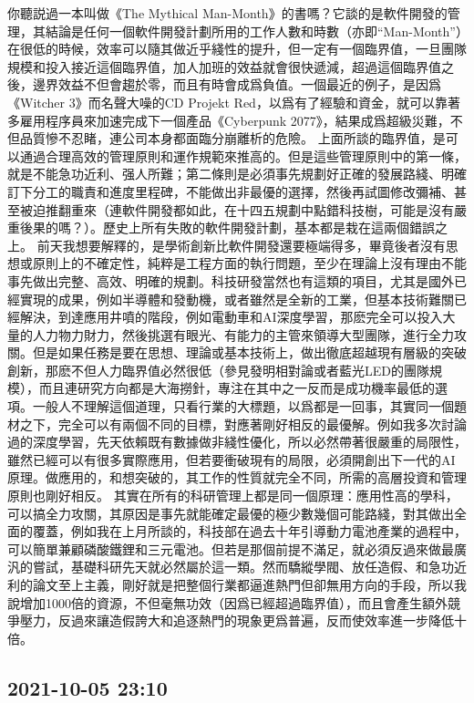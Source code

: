 \documentclass[twocolumn]{ctexart}
\begin{document}
你聽説過一本叫做《The Mythical Man-Month》的書嗎？它談的是軟件開發的管理，其結論是任何一個軟件開發計劃所用的工作人數和時數（亦即“Man-Month”）在很低的時候，效率可以隨其做近乎綫性的提升，但一定有一個臨界值，一旦團隊規模和投入接近這個臨界值，加人加班的效益就會很快遞減，超過這個臨界值之後，邊界效益不但會趨於零，而且有時會成爲負值。一個最近的例子，是因爲《Witcher 3》而名聲大噪的CD Projekt Red，以爲有了經驗和資金，就可以靠著多雇用程序員來加速完成下一個產品《Cyberpunk 2077》，結果成爲超級災難，不但品質慘不忍睹，連公司本身都面臨分崩離析的危險。
上面所談的臨界值，是可以通過合理高效的管理原則和運作規範來推高的。但是這些管理原則中的第一條，就是不能急功近利、强人所難；第二條則是必須事先規劃好正確的發展路綫、明確訂下分工的職責和進度里程碑，不能做出非最優的選擇，然後再試圖修改彌補、甚至被迫推翻重來（連軟件開發都如此，在十四五規劃中點錯科技樹，可能是沒有嚴重後果的嗎？）。歷史上所有失敗的軟件開發計劃，基本都是栽在這兩個錯誤之上。
前天我想要解釋的，是學術創新比軟件開發還要極端得多，畢竟後者沒有思想或原則上的不確定性，純粹是工程方面的執行問題，至少在理論上沒有理由不能事先做出完整、高效、明確的規劃。科技研發當然也有這類的項目，尤其是國外已經實現的成果，例如半導體和發動機，或者雖然是全新的工業，但基本技術難關已經解決，到達應用井噴的階段，例如電動車和AI深度學習，那麽完全可以投入大量的人力物力財力，然後挑選有眼光、有能力的主管來領導大型團隊，進行全力攻關。但是如果任務是要在思想、理論或基本技術上，做出徹底超越現有層級的突破創新，那麽不但人力臨界值必然很低（參見發明相對論或者藍光LED的團隊規模），而且連研究方向都是大海撈針，專注在其中之一反而是成功機率最低的選項。一般人不理解這個道理，只看行業的大標題，以爲都是一回事，其實同一個題材之下，完全可以有兩個不同的目標，對應著剛好相反的最優解。例如我多次討論過的深度學習，先天依賴既有數據做非綫性優化，所以必然帶著很嚴重的局限性，雖然已經可以有很多實際應用，但若要衝破現有的局限，必須開創出下一代的AI原理。做應用的，和想突破的，其工作的性質就完全不同，所需的高層投資和管理原則也剛好相反。
其實在所有的科研管理上都是同一個原理：應用性高的學科，可以搞全力攻關，其原因是事先就能確定最優的極少數幾個可能路綫，對其做出全面的覆蓋，例如我在上月所談的，科技部在過去十年引導動力電池產業的過程中，可以簡單兼顧磷酸鐵鋰和三元電池。但若是那個前提不滿足，就必須反過來做最廣汎的嘗試，基礎科研先天就必然屬於這一類。然而驕縱學閥、放任造假、和急功近利的論文至上主義，剛好就是把整個行業都逼進熱門但卻無用方向的手段，所以我說增加1000倍的資源，不但毫無功效（因爲已經超過臨界值），而且會產生額外競爭壓力，反過來讓造假誇大和追逐熱門的現象更爲普遍，反而使效率進一步降低十倍。
\subsection*{2021-10-05 23:10}
\end{document}

